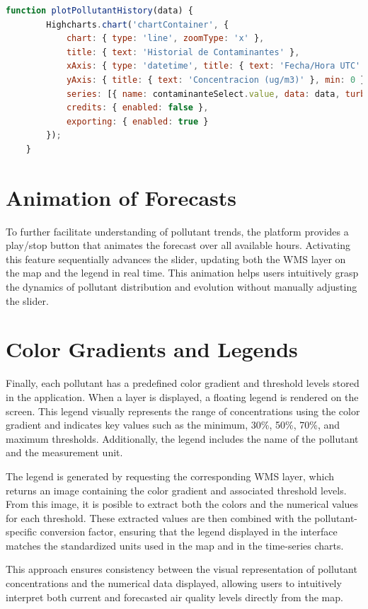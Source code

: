 \begin{lstlisting}[language=JavaScript, caption={Plotting historical pollutant data using Highcharts}]
	function plotPollutantHistory(data) {
		Highcharts.chart('chartContainer', {
			chart: { type: 'line', zoomType: 'x' },
			title: { text: 'Historial de Contaminantes' },
			xAxis: { type: 'datetime', title: { text: 'Fecha/Hora UTC' } },
			yAxis: { title: { text: 'Concentracion (ug/m3)' }, min: 0 },
			series: [{ name: contaminanteSelect.value, data: data, turboThreshold: 0 }],
			credits: { enabled: false },
			exporting: { enabled: true }
		});
	}
\end{lstlisting}

\section{Animation of Forecasts}

To further facilitate understanding of pollutant trends, the platform provides a play/stop button that animates the forecast over all available hours. Activating this feature sequentially advances the slider, updating both the WMS layer on the map and the legend in real time. This animation helps users intuitively grasp the dynamics of pollutant distribution and evolution without manually adjusting the slider.

\section{Color Gradients and Legends}

Finally, each pollutant has a predefined color gradient and threshold levels stored in the application. When a layer is displayed, a floating legend is rendered on the screen. This legend visually represents the range of concentrations using the color gradient and indicates key values such as the minimum, 30\%, 50\%, 70\%, and maximum thresholds. Additionally, the legend includes the name of the pollutant and the measurement unit.

The legend is generated by requesting the corresponding WMS layer, which returns an image containing the color gradient and associated threshold levels. From this image, it is posible to extract both the colors and the numerical values for each threshold. These extracted values are then combined with the pollutant-specific conversion factor, ensuring that the legend displayed in the interface matches the standardized units used in the map and in the time-series charts.

This approach ensures consistency between the visual representation of pollutant concentrations and the numerical data displayed, allowing users to intuitively interpret both current and forecasted air quality levels directly from the map.